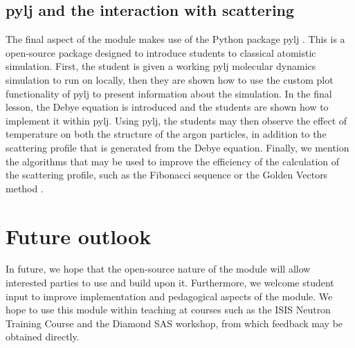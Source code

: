 \documentclass[pdf]{iucr}              %
\begin{document}
\subsection{pylj and the interaction with scattering}

The final aspect of the module makes use of the Python package pylj \cite{McCluskey2018}.
This is a open-source package designed to introduce students to classical atomistic simulation.
First, the student is given a working pylj molecular dynamics simulation to run on locally, then they are shown how to use the custom plot functionality of pylj to present information about the simulation.
In the final lesson, the Debye equation is introduced and the students are shown how to implement it within pylj.
Using pylj, the students may then observe the effect of temperature on both the structure of the argon particles, in addition to the scattering profile that is generated from the Debye equation.
Finally, we mention the algorithms that may be used to improve the efficiency of the calculation of the scattering profile, such as the Fibonacci sequence or the Golden Vectors method \cite{Svergun1994, Watson2013}.

\section{Future outlook}

In future, we hope that the open-source nature of the module will allow interested parties to use and build upon it.
Furthermore, we welcome student input to improve implementation and pedagogical aspects of the module.
We hope to use this module within teaching at courses such as the ISIS Neutron Training Course and the Diamond SAS workshop, from which feedback may be obtained directly.





\end{document}
